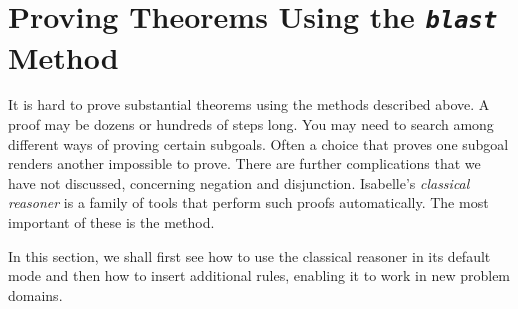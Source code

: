 \section{Proving Theorems Using the {\tt\slshape blast} Method}

%
It is hard to prove substantial theorems using the methods 
described above. A proof may be dozens or hundreds of steps long.  You 
may need to search among different ways of proving certain 
subgoals. Often a choice that proves one subgoal renders another 
impossible to prove.  There are further complications that we have not
discussed, concerning negation and disjunction.  Isabelle's
\emph{classical reasoner} is a family of tools that perform such
proofs automatically.  The most important of these is the 
 method. 

In this section, we shall first see how to use the classical 
reasoner in its default mode and then how to insert additional 
rules, enabling it to work in new problem domains. 

